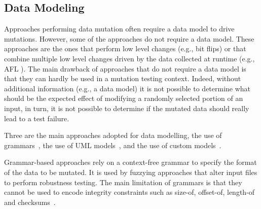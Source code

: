 
\subsection{Data Modeling}
\label{sec:dataModeling}

Approaches performing data mutation often require a data model to drive mutations. However, some of the approaches do not require a data model. 
These approaches are the ones that perform low level changes (e.g., bit flips) or that combine multiple low level changes driven by the data collected at runtime (e.g., AFL ).
The main drawback of approaches that do not require a data model is that they can hardly be used in a mutation testing context.
Indeed, without additional information (e.g., a data model) it is not possible to determine what should be the expected effect of modifying a randomly selected portion of an input, in turn, it is not possible to determine if the mutated data should really lead to a test failure.

Three are the main approaches adopted for data modelling, the use of grammars~\cite{Godefroid:GrammarBasedFuzzying:2008,godefroid2012sage,bounimova2013billions}, the use of UML models~\cite{di2015evolutionary}, and the use of custom models~\cite{pham2016model,PeachFuzzer}.

Grammar-based approaches rely on a context-free grammar to specify the format of the data to be mutated. It is used by fuzzying approaches that alter input files to perform robustness testing.
The main limitation of grammars is that they cannot be used to encode integrity constraints such as size-of, offset-of, length-of and checksums~\cite{pham2016model}. 

